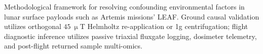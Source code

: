 \begin{table}[t]
\begin{tabular*}{\textwidth}{@{\extracolsep\fill}p{2.0cm}p{1.1cm}p{1.3cm}p{2.3cm}p{2.3cm}p{2.3cm}p{2.4cm}p{2.4cm}@{}}
\bottomrule
\end{tabular*}
\begin{tablenotes}
\item Methodological framework for resolving confounding environmental factors in lunar surface payloads such as Artemis missions' LEAF. Ground causal validation utilizes orthogonal $45~\upmu$T Helmholtz re-application or 1g centrifugation; flight diagnostic inference utilizes passive triaxial fluxgate logging, dosimeter telemetry, and post-flight returned sample multi-omics.
\end{tablenotes}
\end{table}
